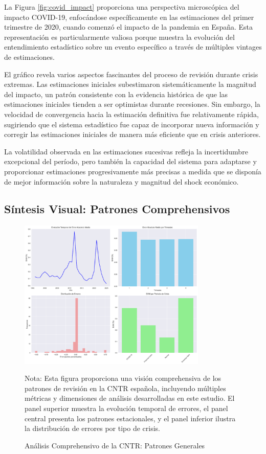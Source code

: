 \documentclass[12pt,a4paper]{article}
\begin{document}
La Figura \ref{fig:covid_impact} proporciona una perspectiva microscópica del impacto COVID-19, enfocándose específicamente en las estimaciones del primer trimestre de 2020, cuando comenzó el impacto de la pandemia en España. Esta representación es particularmente valiosa porque muestra la evolución del entendimiento estadístico sobre un evento específico a través de múltiples vintages de estimaciones.

El gráfico revela varios aspectos fascinantes del proceso de revisión durante crisis extremas. Las estimaciones iniciales subestimaron sistemáticamente la magnitud del impacto, un patrón consistente con la evidencia histórica de que las estimaciones iniciales tienden a ser optimistas durante recesiones. Sin embargo, la velocidad de convergencia hacia la estimación definitiva fue relativamente rápida, sugiriendo que el sistema estadístico fue capaz de incorporar nueva información y corregir las estimaciones iniciales de manera más eficiente que en crisis anteriores.

La volatilidad observada en las estimaciones sucesivas refleja la incertidumbre excepcional del período, pero también la capacidad del sistema para adaptarse y proporcionar estimaciones progresivamente más precisas a medida que se disponía de mejor información sobre la naturaleza y magnitud del shock económico.

\subsection{Síntesis Visual: Patrones Comprehensivos}

\begin{figure}[h]
\centering
\includegraphics[width=0.8\textwidth]{../figuras/analisis_cntr_graficos.png}
\caption{Análisis Comprehensivo de la CNTR: Patrones Generales}
\label{fig:analisis_general}
\begin{flushleft}
\footnotesize
Nota: Esta figura proporciona una visión comprehensiva de los patrones de revisión en la CNTR española, incluyendo múltiples métricas y dimensiones de análisis desarrolladas en este estudio. El panel superior muestra la evolución temporal de errores, el panel central presenta los patrones estacionales, y el panel inferior ilustra la distribución de errores por tipo de crisis.
\end{flushleft}
\end{figure}
\end{document}
